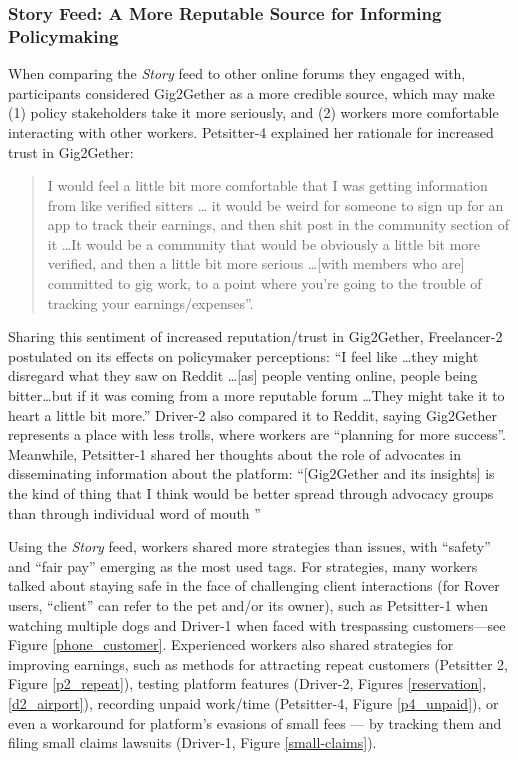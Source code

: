 \subsubsection{{{Story Feed: A More Reputable Source for Informing Policymaking}}}
When comparing the \textit{Story} feed to other online forums they engaged with, participants considered Gig2Gether as a more credible source, which may make (1) policy stakeholders take it more seriously, and (2) workers more comfortable interacting with other workers. Petsitter-4 explained her rationale for increased trust in Gig2Gether: 
\begin{quote}
I would feel a little bit more comfortable that I was getting information from like verified sitters \dots
it would be weird for someone to sign up for an app to track their earnings, and then shit post in the community section of it \dots It would be a community that would be obviously a little bit more verified, and then a little bit more serious \dots [with members who are] committed to gig work, to a point where you're going to the trouble of tracking your earnings/expenses''.     
\end{quote}
Sharing this sentiment of increased reputation/trust in Gig2Gether, Freelancer-2 postulated on its effects on policymaker perceptions: ``I feel like \dots they might disregard what they saw on Reddit \dots [as] people venting online, people being bitter\dots but if it was coming from a more reputable forum \dots They might take it to heart a little bit more.'' Driver-2 also compared it to Reddit, saying Gig2Gether represents a place with less trolls, where workers are ``planning for more success''.
Meanwhile, Petsitter-1 shared her thoughts about the role of advocates in disseminating information about the platform: ``[Gig2Gether and its insights] is the kind of thing that I think would be better spread through advocacy groups than through individual word of mouth ''


{Using} the \textit{Story} feed, workers shared more strategies than issues, with ``safety'' and ``{fair pay}'' emerging as the most used tags. 
For strategies, many workers talked about staying safe in the face of challenging client interactions (for Rover users, ``client'' can refer to the pet and/or its owner), such as Petsitter-1 when watching multiple dogs and Driver-1 when faced with trespassing customers---see Figure \ref{phone_customer}. 
Experienced workers also shared strategies for improving earnings, such as methods for attracting repeat customers (Petsitter 2, Figure \ref{p2_repeat}), testing platform features (Driver-2, Figures \ref{reservation}, \ref{d2_airport}), recording unpaid work/time (Petsitter-4, Figure \ref{p4_unpaid}), or even a workaround for platform's evasions of small fees --- by tracking them and filing small claims lawsuits (Driver-1, Figure \ref{small-claims}). 

